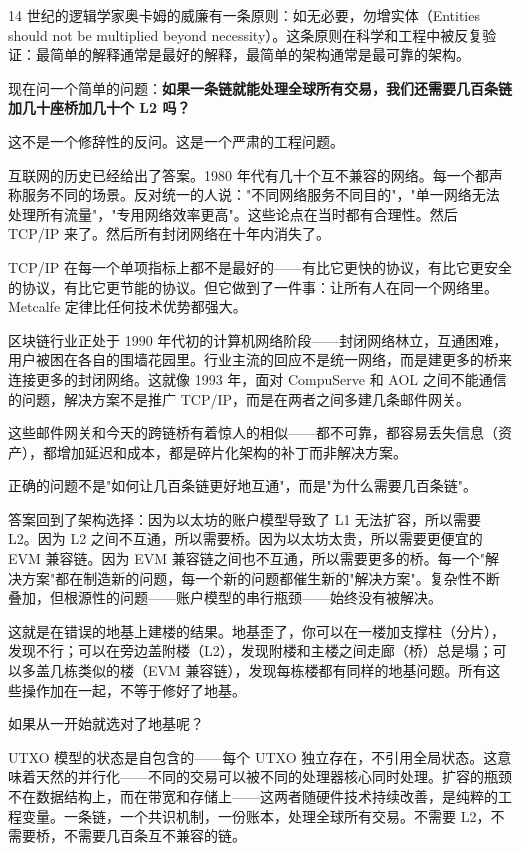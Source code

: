 \documentclass[a4paper,12pt,openany]{ctexbook}
\begin{document}
14 世纪的逻辑学家奥卡姆的威廉有一条原则：如无必要，勿增实体（Entities should not be multiplied beyond necessity）。这条原则在科学和工程中被反复验证：最简单的解释通常是最好的解释，最简单的架构通常是最可靠的架构。

现在问一个简单的问题：\textbf{如果一条链就能处理全球所有交易，我们还需要几百条链加几十座桥加几十个 L2 吗？}

这不是一个修辞性的反问。这是一个严肃的工程问题。

互联网的历史已经给出了答案。1980 年代有几十个互不兼容的网络。每一个都声称服务不同的场景。反对统一的人说："不同网络服务不同目的"，"单一网络无法处理所有流量"，"专用网络效率更高"。这些论点在当时都有合理性。然后 TCP/IP 来了。然后所有封闭网络在十年内消失了。

TCP/IP 在每一个单项指标上都不是最好的——有比它更快的协议，有比它更安全的协议，有比它更节能的协议。但它做到了一件事：让所有人在同一个网络里。Metcalfe 定律比任何技术优势都强大。

区块链行业正处于 1990 年代初的计算机网络阶段——封闭网络林立，互通困难，用户被困在各自的围墙花园里。行业主流的回应不是统一网络，而是建更多的桥来连接更多的封闭网络。这就像 1993 年，面对 CompuServe 和 AOL 之间不能通信的问题，解决方案不是推广 TCP/IP，而是在两者之间多建几条邮件网关。

这些邮件网关和今天的跨链桥有着惊人的相似——都不可靠，都容易丢失信息（资产），都增加延迟和成本，都是碎片化架构的补丁而非解决方案。

正确的问题不是"如何让几百条链更好地互通"，而是"为什么需要几百条链"。

答案回到了架构选择：因为以太坊的账户模型导致了 L1 无法扩容，所以需要 L2。因为 L2 之间不互通，所以需要桥。因为以太坊太贵，所以需要更便宜的 EVM 兼容链。因为 EVM 兼容链之间也不互通，所以需要更多的桥。每一个"解决方案"都在制造新的问题，每一个新的问题都催生新的"解决方案"。复杂性不断叠加，但根源性的问题——账户模型的串行瓶颈——始终没有被解决。

这就是在错误的地基上建楼的结果。地基歪了，你可以在一楼加支撑柱（分片），发现不行；可以在旁边盖附楼（L2），发现附楼和主楼之间走廊（桥）总是塌；可以多盖几栋类似的楼（EVM 兼容链），发现每栋楼都有同样的地基问题。所有这些操作加在一起，不等于修好了地基。

如果从一开始就选对了地基呢？

UTXO 模型的状态是自包含的——每个 UTXO 独立存在，不引用全局状态。这意味着天然的并行化——不同的交易可以被不同的处理器核心同时处理。扩容的瓶颈不在数据结构上，而在带宽和存储上——这两者随硬件技术持续改善，是纯粹的工程变量。一条链，一个共识机制，一份账本，处理全球所有交易。不需要 L2，不需要桥，不需要几百条互不兼容的链。
\end{document}
